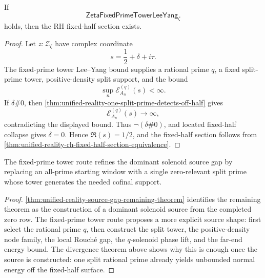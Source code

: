 \begin{theorem}
\label{thm:unified-reality-fixed-prime-tower-bound-conditionally-sufficient}
If
$$
\mathsf{ZetaFixedPrimeTowerLeeYang}_{\zeta}
$$
holds, then the RH fixed-half section exists.
\end{theorem}

\begin{proof}
Let $z:\mathcal Z_{\zeta}$ have complex coordinate
$$
s=\frac12+\delta+i\tau.
$$
The fixed-prime tower Lee--Yang bound supplies a rational prime $q$, a
fixed split-prime tower, positive-density split support, and the bound
$$
\sup_n\mathcal E_{A_n}^{(q)}(s)<\infty.
$$
If $\delta\#0$, then
\autoref{thm:unified-reality-one-split-prime-detects-off-half} gives
$$
\mathcal E_{A_n}^{(q)}(s)\to\infty,
$$
contradicting the displayed bound.  Thus $\neg(\delta\#0)$, and located
fixed-half collapse gives $\delta=0$.  Hence $\Re(s)=1/2$, and the
fixed-half section follows from
\autoref{thm:unified-reality-rh-fixed-half-section-equivalence}.
\end{proof}

\begin{corollary}
\label{cor:unified-reality-fixed-prime-towers-refine-source-gap}
The fixed-prime tower route refines the dominant solenoid source gap by
replacing an all-prime starting window with a single zero-relevant split
prime whose tower generates the needed cofinal support.
\end{corollary}

\begin{proof}
\autoref{thm:unified-reality-source-gap-remaining-theorem} identifies
the remaining theorem as the construction of a dominant solenoid source
from the completed zero row.  The fixed-prime tower route proposes a
more explicit source shape: first select the rational prime $q$, then
construct the split tower, the positive-density node family, the local
Rouch\'e gap, the $q$-solenoid phase lift, and the far-end energy bound.
The divergence theorem above shows why this is enough once the source is
constructed: one split rational prime already yields unbounded normal
energy off the fixed-half surface.
\end{proof}
